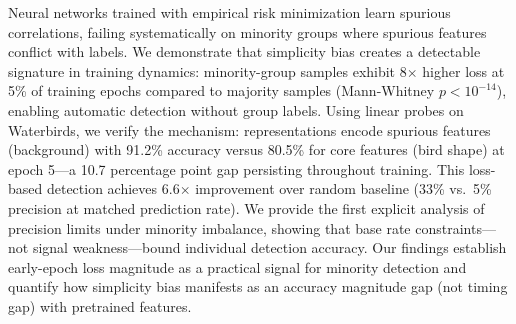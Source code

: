 Neural networks trained with empirical risk minimization learn spurious correlations, failing systematically on minority groups where spurious features conflict with labels. We demonstrate that simplicity bias creates a detectable signature in training dynamics: minority-group samples exhibit 8$\times$ higher loss at 5\% of training epochs compared to majority samples (Mann-Whitney $p < 10^{-14}$), enabling automatic detection without group labels. Using linear probes on Waterbirds, we verify the mechanism: representations encode spurious features (background) with 91.2\% accuracy versus 80.5\% for core features (bird shape) at epoch 5---a 10.7 percentage point gap persisting throughout training. This loss-based detection achieves 6.6$\times$ improvement over random baseline (33\% vs.\ 5\% precision at matched prediction rate). We provide the first explicit analysis of precision limits under minority imbalance, showing that base rate constraints---not signal weakness---bound individual detection accuracy. Our findings establish early-epoch loss magnitude as a practical signal for minority detection and quantify how simplicity bias manifests as an accuracy magnitude gap (not timing gap) with pretrained features.
